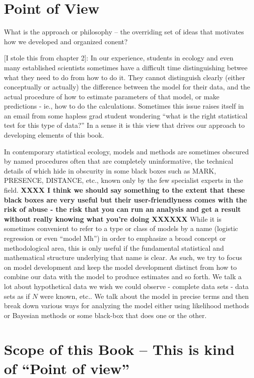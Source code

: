 \section*{Point of View}

What is the approach or philosophy -- the overriding set of ideas that
motivates how we developed and organized conent?

[I stole this from chapter 2]:
In our experience, students in ecology and even many established
scientists sometimes have a difficult time distinguishing
betwee what they need to do  from how to do
it.  They cannot distinguish clearly (either conceptually or actually)
the difference between the model for their data, and the actual
procedure of how to estimate parameters of that model, or make
predictions - ie., how to do the calculations. Sometimes this issue
raises itself in an email from some hapless grad student wondering
``what is the right statistical test for this type of data?''  In a
sense it is this view that drives our approach to developing elements
of this book.

In contemporary statistical ecology, models and methods are sometimes
obscured by named procedures often that are completely uninformative,
the technical details of which hide in obscurity in some black boxes
such as MARK, PRESENCE, DISTANCE, etc., known only by the few
specialist experts in the field.  {\bf XXXX I think we should say
  something to the extent that these black boxes are very useful but
  their user-friendlyness comes with the risk of abuse - the risk that
  you can run an analysis and get a result without really knowing what
  you're doing XXXXXX}  While it is sometimes convenient to refer to a
type or class of models by a name (logistic regression or even ``model
Mh'') in order to emphasize a broad concept or methodological area,
this is only useful if the fundamental statistical and mathematical
structure underlying that name is clear. As such, we try to focus on
model development and keep the model development distinct from how to
combine our data with the model to produce estimates and so forth. We
talk a lot about hypothetical data we wish we could observe - complete
data sets - data sets as if $N$ were known, etc.. We talk about the
model in precise terms and then break down various ways for analyzing
the model either using likelihood methods or Bayesian methods or some
black-box that does one or the other.



\section{Scope of this Book  
-- This is kind of ``Point of view''}

